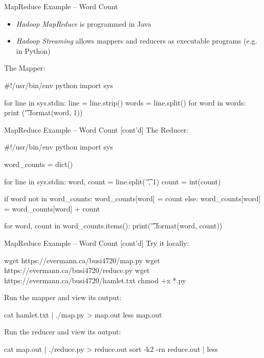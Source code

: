 \documentclass[ignorenonframetext,xcolor=x11names]{beamer}
\begin{document}
\begin{frame}[label=withcode,fragile]{MapReduce Example -- Word Count}

\begin{itemize}
    \item \emph{Hadoop MapReduce} is programmed in Java
    \item \emph{Hadoop Streaming} allows mappers and reducers as executable programs (e.g. in Python)
\end{itemize}
\vspace{\baselineskip}
The Mapper:
\begin{pythoncode}
#!/usr/bin/env python
import sys

for line in sys.stdin:
    line = line.strip()
    words = line.split()
    for word in words:
        print ('{}\t{}'.format(word, 1))
\end{pythoncode}
\end{frame}

\begin{frame}[label=withcode,fragile]{MapReduce Example -- Word Count \small [cont'd]}
The Reducer:
\begin{pythoncode}
#!/usr/bin/env python
import sys

word_counts = dict()

for line in sys.stdin:
    word, count = line.split('\t', 1)
    count = int(count)

    if word not in word_counts:
       word_counts[word] = count
    else:
      word_counts[word] = word_counts[word] + count

for word, count in word_counts.items():
    print('{}\t{}'.format(word, count))
\end{pythoncode}
\end{frame}

\begin{frame}[label=withcode,fragile]{MapReduce Example -- Word Count \small [cont'd]}
Try it locally:
\begin{bashcode}
wget https://evermann.ca/busi4720/map.py
wget https://evermann.ca/busi4720/reduce.py
wget https://evermann.ca/busi4720/hamlet.txt
chmod +x *.py
\end{bashcode}
Run the mapper and view its output:
\begin{bashcode}
cat hamlet.txt | ./map.py > map.out
less map.out
\end{bashcode}
Run the reducer and view its output:
\begin{bashcode}
cat map.out | ./reduce.py > reduce.out
sort -k2 -rn reduce.out | less
\end{bashcode}
\end{frame}
\end{document}
